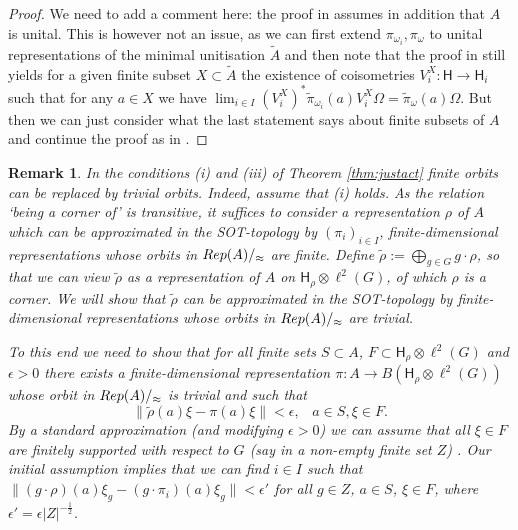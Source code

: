 \documentclass[11 pt, leqno, hidelinks]{amsart}%
\theoremstyle{plain}
\newtheorem{remark}[theorem]{Remark}
\numberwithin{equation}{section}
\newcommand{\Rep}{\textup{Rep}}
\newcommand{\Hil}{\mathsf{H}}
\begin{document}
\begin{proof}
	We need to add a comment here: the proof in \cite{ExelLoring} assumes in addition that $A$ is unital. This is however not an issue, as we can first extend $\pi_{\omega_i}, \pi_\omega$ to unital representations of the minimal unitisation $\tilde{A}$ and then note that the proof in \cite{ExelLoring} still yields for a given finite subset $X \subset \tilde{A}$ the existence of coisometries $V_i^X:\Hil \to \Hil_i$ such that for any $a \in X$ we have $\lim_{i \in I} (V_i^X)^*\tilde{\pi}_{\omega_i}(a) V_i^X\Omega = \tilde{\pi}_\omega (a) \Omega$. But then we can just consider what the last statement says about finite subsets of $A$ and continue the proof as in \cite{ExelLoring}.


\end{proof}

\begin{remark}
	\label{rem:triv}
	In the conditions (i) and (iii) of Theorem \ref{thm:justact} finite orbits can be replaced by trivial orbits. Indeed,  assume  that (i) holds.	As the relation `being a corner of' is transitive, it suffices to consider a representation $\rho$  of $A$ which can be approximated in the SOT-topology by $(\pi_i)_{i \in I}$, finite-dimensional representations whose orbits in $\Rep(A)/_\approx$ are finite.
	Define $\tilde{\rho}:= \bigoplus_{g \in G} g \cdot \rho$, so that we can view $\tilde{\rho}$ as a representation of $A$ on $\Hil_\rho \otimes \ell^2(G)$, of which $\rho$ is a corner. We will show that $\tilde{\rho}$ can be approximated in the SOT-topology by finite-dimensional representations whose orbits in $\Rep(A)/_\approx$ are trivial.
	
To this end we need to show that for all  finite sets $S\subset A$, $F \subset   \Hil_\rho \otimes \ell^2(G)$ and $\epsilon>0$ there exists a finite-dimensional representation $\pi:A \to B(\Hil_\rho \otimes \ell^2(G))$ whose orbit in $\Rep(A)/_\approx$ is trivial and such that
	\begin{equation}\|\tilde{\rho}(a) \xi - \pi(a)\xi \|<\epsilon, \;\;\; a \in S, \xi \in F. \label{approxlocal}\end{equation} 	
By a standard approximation (and modifying $\epsilon>0$) we can assume that all $\xi \in F$ %
are finitely supported with respect to $G$ (say in a non-empty finite set $Z$)%
.  Our initial  assumption implies that we can find $i \in I$ such that $\|(g \cdot\rho)(a) \xi_g -  (g \cdot\pi_i)(a)\xi_g \|<\epsilon'$ for all $g \in Z$, $ a\in S$, $\xi \in F$, where $\epsilon ' = \epsilon |Z|^{-\frac{1}{2}}$.


\end{remark}
\end{document}
